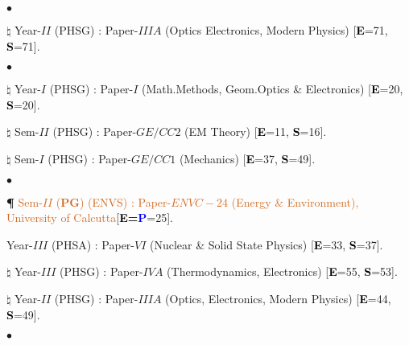 \documentclass[margin,line]{res}
\newenvironment{list1}{
  \begin{list}{\ding{113}}{%
      \setlength{\itemsep}{0in}
      \setlength{\parsep}{0in} \setlength{\parskip}{0in}
      \setlength{\topsep}{0in} \setlength{\partopsep}{0in} 
      \setlength{\leftmargin}{0.17in}}}{\end{list}}
\newenvironment{list2}{
  \begin{list}{$\bullet$}{%
      \setlength{\itemsep}{0in}
      \setlength{\parsep}{0in} \setlength{\parskip}{0in}
      \setlength{\topsep}{0in} \setlength{\partopsep}{0in} 
      \setlength{\leftmargin}{0.2in}}}{\end{list}}
\begin{document}
\begin{resume}
\begin{list2}
\item[$\pmb{\natural}$] Year-$II$ (PHSG) : Paper-$IIIA$ (Optics Electronics, Modern Physics) [\textcolor{black}{\bf E}=71, \textcolor{black}{\bf S}=71]. 
\end{list2}
\begin{list1}
\item[] \textcolor{iris}{}
\vspace{1mm}
\end{list1}
\begin{list2}
\item[$\pmb{\natural}$] Year-$I$ (PHSG) : Paper-$I$ (Math.Methods, Geom.Optics \& Electronics) [\textcolor{black}{\bf E}=20, \textcolor{black}{\bf S}=20]. 
\item[$\pmb{\natural}$] Sem-$II$ (PHSG) : Paper-$GE/CC2$ (EM Theory) [\textcolor{black}{\bf E}=11, \textcolor{black}{\bf S}=16]. 
\item[$\pmb{\natural}$] Sem-$I$ (PHSG) : Paper-$GE/CC1$ (Mechanics) [\textcolor{black}{\bf E}=37, \textcolor{black}{\bf S}=49]. 
\end{list2}
\begin{list1}
\item[] \textcolor{iris}{}
\vspace{1mm}
\end{list1}
\begin{list2}
\item[{\bf \P}] \textcolor{chocolate}{Sem-$II$ (\textcolor{iris}{\bf PG}) (ENVS) : Paper-$ENVC-24$ (Energy \& Environment), University of 
                Calcutta}[\textcolor{black}{\bf E=\textcolor{blue}{\bf P}}=25].
\item Year-$III$ (PHSA) : Paper-$VI$ (Nuclear \& Solid State Physics) [\textcolor{black}{\bf E}=33, \textcolor{black}{\bf S}=37]. 
\item[$\pmb{\natural}$] Year-$III$ (PHSG) : Paper-$IVA$ (Thermodynamics, Electronics) [\textcolor{black}{\bf E}=55, \textcolor{black}{\bf S}=53].
\item[$\pmb{\natural}$] Year-$II$ (PHSG) : Paper-$IIIA$ (Optics, Electronics, Modern Physics) [\textcolor{black}{\bf E}=44, \textcolor{black}{\bf S}=49].
\end{list2}
\begin{list1}
\item[] \textcolor{iris}{}
\vspace{1mm}
\end{list1}
\begin{list2}

\end{list2}
\end{resume}
\end{document}
